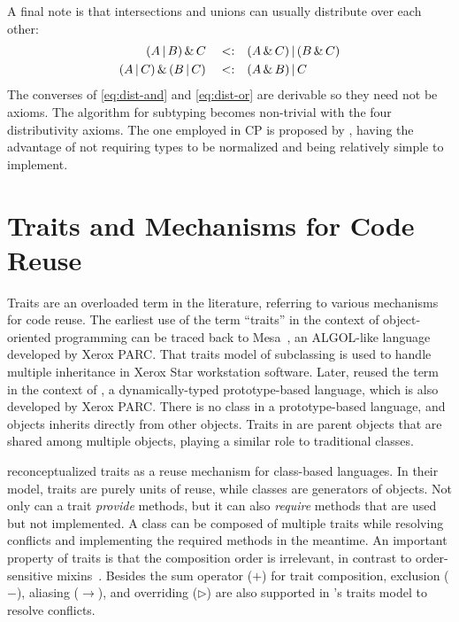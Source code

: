 A final note is that intersections and unions can usually distribute over each other:
\begin{align}
(A \,|\, B) \,\&\, C  \quad          <:& \quad  (A \,\&\, C) \,|\, (B \,\&\, C) \label{eq:dist-and} \\
(A \,|\, C) \,\&\, (B \,|\, C)  \quad <:& \quad  (A \,\&\, B) \,|\, C \label{eq:dist-or}
\end{align}
The converses of \autoref{eq:dist-and} and \autoref{eq:dist-or} are derivable so
they need not be axioms. The algorithm for subtyping becomes non-trivial with
the four distributivity axioms. The one employed in CP is proposed by
\citet{huang2021distributing}, having the advantage of not requiring types to be
normalized and being relatively simple to implement.

\section{Traits and Mechanisms for Code Reuse}

Traits are an overloaded term in the literature, referring to various mechanisms
for code reuse. The earliest use of the term ``traits'' in the context of
object-oriented programming can be traced back to Mesa~\citep{curry1982traits},
an ALGOL-like language developed by Xerox PARC. That traits model of subclassing
is used to handle multiple inheritance in Xerox Star workstation software.
Later, \citet{ungar1991organizing} reused the term in the context of \self, a
dynamically-typed prototype-based language, which is also developed by Xerox
PARC. There is no class in a prototype-based language, and objects inherits
directly from other objects. Traits in \self are parent objects that are shared
among multiple objects, playing a similar role to traditional classes.

\citet{ducasse2006traits} reconceptualized traits as a reuse mechanism for
class-based languages. In their model, traits are purely units of reuse, while
classes are generators of objects. Not only can a trait \emph{provide} methods,
but it can also \emph{require} methods that are used but not implemented. A
class can be composed of multiple traits while resolving conflicts and
implementing the required methods in the meantime. An important property of
traits is that the composition order is irrelevant, in contrast to
order-sensitive mixins~\citep{bracha1990mixin}. Besides the sum operator ($+$)
for trait composition, exclusion ($-$), aliasing ($\to$), and overriding
($\rhd$) are also supported in \citeauthor{ducasse2006traits}'s traits model to
resolve conflicts.

